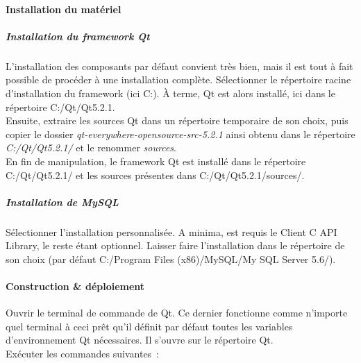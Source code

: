 \paragraph{Installation du matériel}

\subparagraph{Installation du framework Qt}
L'installation des composants par défaut convient très bien, mais il est tout à fait possible de procéder à une installation complète. Sélectionner le répertoire racine d'installation du framework (ici C:). À terme, Qt est alors installé, ici dans le répertoire C:/Qt/Qt5.2.1.
\\
Ensuite, extraire les sources Qt dans un répertoire temporaire de son choix, puis copier le dossier \textit{qt-everywhere-opensource-src-5.2.1} ainsi obtenu dans le répertoire \textit{C:/Qt/Qt5.2.1/} et le renommer \textit{sources}.
\\
En fin de manipulation, le framework Qt est installé dans le répertoire C:/Qt/Qt5.2.1/ et les sources présentes dans C:/Qt/Qt5.2.1/sources/.

\subparagraph{Installation de MySQL}
Sélectionner l'installation personnalisée.
A minima, est requis le {\quote Client C API Library}, le reste étant optionnel.
Laisser faire l'installation dans le répertoire de son choix (par défaut C:/Program Files (x86)/MySQL/My SQL Server 5.6/).

\paragraph{Construction \& déploiement}
Ouvrir le terminal de commande de Qt.
Ce dernier fonctionne comme n'importe quel terminal à ceci prêt qu'il définit par défaut toutes les variables d'environnement Qt nécessaires.
Il s'ouvre sur le répertoire Qt.
\\
Exécuter les commandes suivantes~:


